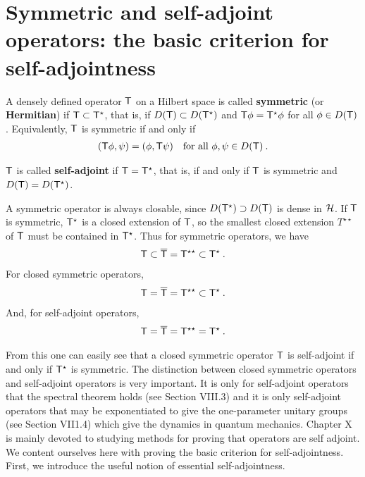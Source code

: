\section{Symmetric and self-adjoint operators:
the basic criterion for self-adjointness}

\begin{definition}
A densely defined operator $\mathsf{T}$ on a Hilbert space is called \textbf{symmetric} (or \textbf{Hermitian}) if $\mathsf{T} \subset \mathsf{T}^\star$, that is, if $D(\mathsf{T}) \subset D(\mathsf{T}^\star)$ and $\mathsf{T} \phi = \mathsf{T}^\star \phi$ for all $\phi \in D(\mathsf{T})$. Equivalently, $\mathsf{T}$ is symmetric if and only if
\begin{align}
    (\mathsf{T} \phi, \psi) = (\phi, \mathsf{T} \psi) \quad \text{for all } \phi, \psi \in D (\mathsf{T}) \:.
\end{align}

\end{definition}

\begin{definition}
    $\mathsf{T}$ is called \textbf{self-adjoint} if $\mathsf{T} = \mathsf{T}^\star$, that is, if and only if  $\mathsf{T}$ is symmetric and $D(\mathsf{T}) = D(\mathsf{T}^\star)$.
\end{definition}

A symmetric operator is always closable, since $D(\mathsf{T}^\star) \supset D(\mathsf{T})$ is dense in $\mathcal{H}$. If $\mathsf{T}$ is symmetric, $\mathsf{T}^\star$ is a closed extension of $\mathsf{T}$, so the smallest closed extension $T^{\star \star}$ of $\mathsf{T}$ must be contained in $\mathsf{T}^\star$. Thus for symmetric operators, we have
\begin{align}
    \mathsf{T} \subset \mathsf{\overline{T}} = \mathsf{T}^{\star \star}  \subset \mathsf{T}^\star \:.
\end{align}
For closed symmetric operators, \begin{align}
    \mathsf{T} = \mathsf{\overline{T}} = \mathsf{T}^{\star \star} \subset \mathsf{T}^\star \:.
\end{align}
And, for self-adjoint operators,
\begin{align}
    \mathsf{T}= \mathsf{\overline{T}} = \mathsf{T}^{\star \star}  = \mathsf{T}^{\star } \:. 
\end{align}

From this one can easily see that a closed symmetric operator $\mathsf{T}$ is self-adjoint if and only if $\mathsf{T}^\star$ is symmetric.
The distinction between closed symmetric operators and self-adjoint operators is very important. It is only for self-adjoint operators that the spectral theorem holds (see Section VIII.3) and it is only self-adjoint operators that may be exponentiated to give the one-parameter unitary groups (see Section VII1.4) which give the dynamics in quantum mechanics. Chapter X is mainly devoted to studying methods for proving that operators are self adjoint. We content ourselves here with proving the basic criterion for self-adjointness. First, we introduce the useful notion of essential self-adjointness.

